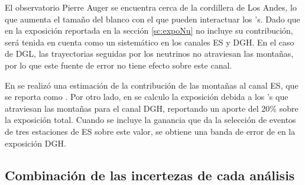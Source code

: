 	El observatorio Pierre Auger se encuentra cerca de la cordillera de Los Andes, lo que aumenta el tamaño del blanco con el que pueden interactuar los \nutau{}'s.
	Dado que en la exposición reportada en la sección \ref{sc:expoNu} no incluye su contribución, será tenida en cuenta como un sistemático en los canales ES y DGH.
	En el caso de DGL, las trayectorias seguidas por los neutrinos no atraviesan las montañas, por lo que este fuente de error no tiene efecto sobre este canal.
	
	En \cite{cite:AugerNu2} se realizó una estimación de la contribución de las montañas al canal ES, que se reporta como .
	Por otro lado, en \cite{cite:AugerNu3} se calculo la exposición debida a los \tauon{}'s que atraviesan las montañas para el canal DGH, reportando un aporte del 20$\%$ sobre la exposición total. 
	Cuando se incluye la ganancia que da la selección de eventos de tres estaciones de ES sobre este valor, se obtiene una banda de error de  en la exposición DGH.
	
	
	\subsection{Combinación de las incertezas de cada análisis}
	
